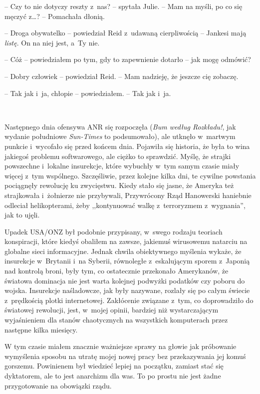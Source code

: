 \documentclass[oneside,polish,11pt,sfheadings]{mwbk}
\begin{document}
-- Czy to nie dotyczy reszty z~nas? -- spytała Julie. -- Mam na myśli, po
co się męczyć z\ldots ? -- Pomachała dłonią.

-- Droga obywatelko -- powiedział Reid z~udawaną cierpliwością -- Jankesi
mają \emph{listę}. On na niej jest, a~Ty nie.

-- Cóż -- powiedziałem po tym, gdy to zapewnienie dotarło -- jak mogę
odmówić?

-- Dobry człowiek -- powiedział Reid. -- Mam nadzieję, że jeszcze cię
zobaczę.

-- Tak jak i~ja, chłopie -- powiedziałem. -- Tak jak i~ja.

~

Następnego dnia ofensywa ANR się rozpoczęła (\emph{Bum według Rozkładu!}, jak
wydanie południowe \emph{Sun-Times} to podsumowało), ale utknęło w~martwym punkcie i~wycofało się przed końcem dnia. Pojawiła się historia,
że była to wina jakiegoś problemu softwarowego, ale ciężko to sprawdzić.
Myślę, że strajki powszechne i~lokalne insurekcje, które wybuchły w~tym
samym czasie miały więcej z~tym wspólnego. Szczęśliwie, przez kolejne
kilka dni, te cywilne powstania pociągnęły rewolucję ku zwycięstwu.
Kiedy stało się jasne, że Ameryka też strajkowała i~żołnierze nie
przybywali, Przywrócony Rząd Hanowerski haniebnie odleciał
helikopterami, żeby ,,kontynuować walkę z~terroryzmem z~wygnania'', jak
to ujęli.

Upadek USA/ONZ był podobnie przypisany, w~swego rodzaju teoriach
konspiracji, które kiedyś obaliłem na zawsze, jakiemuś wirusowemu
natarciu na globalne sieci informacyjne. Jednak chwila obiektywnego
myślenia wykaże, że insurekcje w~Brytanii i~na Syberii, równoległe z~eskalującym sporem z~Japonią nad kontrolą broni, były tym, co
ostatecznie przekonało Amerykanów, że światowa dominacja nie jest warta
kolejnej podwyżki podatków czy poboru do wojska. Insurekcje naśladowcze,
jak były nazywane, rozlały się po całym świecie z~prędkością plotki
internetowej. Zakłócenie związane z~tym, co doprowadziło do światowej
rewolucji, jest, w~mojej opinii, bardziej niż wystarczającym
wyjaśnieniem dla stanów chaotycznych na wszystkich komputerach przez
następne kilka miesięcy.

W tym czasie miałem znacznie ważniejsze sprawy na głowie jak próbowanie
wymyślenia sposobu na utratę mojej nowej pracy bez przekazywania jej
komuś gorszemu. Powinienem był wiedzieć lepiej na początku, zamiast stać
się dyktatorem, ale to jest anarchizm dla was. To po prostu nie jest
żadne przygotowanie na obowiązki rządu.
\end{document}
